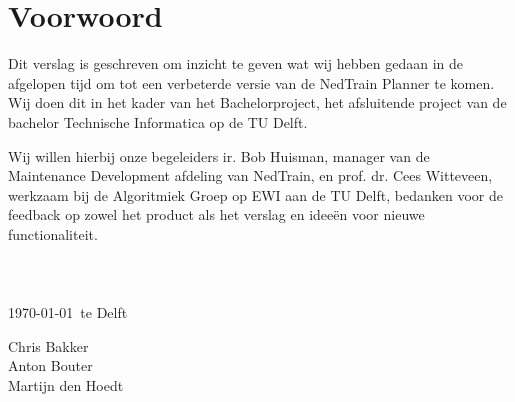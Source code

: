 \section*{Voorwoord}
Dit verslag is geschreven om inzicht te geven wat wij hebben gedaan in de afgelopen tijd om tot een verbeterde versie van de NedTrain Planner te komen. Wij doen dit in het kader van het Bachelorproject, het afsluitende project van de bachelor Technische Informatica op de TU Delft.

Wij willen hierbij onze begeleiders ir. Bob Huisman, manager van de Maintenance Development afdeling van NedTrain, en prof. dr. Cees Witteveen, werkzaam bij de Algoritmiek Groep op EWI aan de TU Delft, bedanken voor de feedback op zowel het product als het verslag en idee\"en voor nieuwe functionaliteit. 
\\ \\ \\ \\
\today ~te Delft

Chris Bakker \\
Anton Bouter \\
Martijn den Hoedt
